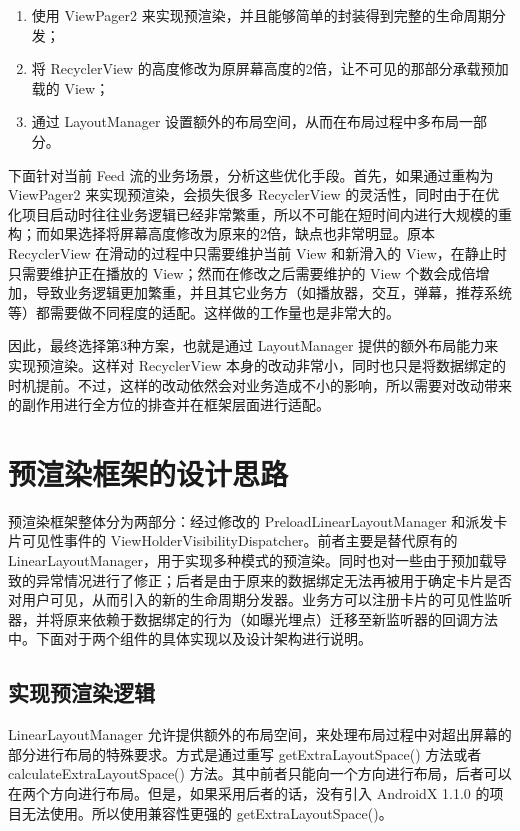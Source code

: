 \begin{enumerate}
    \item 使用 ViewPager2 来实现预渲染，并且能够简单的封装得到完整的生命周期分发；
    \item 将 RecyclerView 的高度修改为原屏幕高度的2倍，让不可见的那部分承载预加载的 View；
    \item 通过 LayoutManager 设置额外的布局空间，从而在布局过程中多布局一部分。
\end{enumerate}

下面针对当前 Feed 流的业务场景，分析这些优化手段。首先，如果通过重构为 ViewPager2 来实现预渲染，会损失很多 RecyclerView 的灵活性，同时由于在优化项目启动时往往业务逻辑已经非常繁重，所以不可能在短时间内进行大规模的重构；而如果选择将屏幕高度修改为原来的2倍，缺点也非常明显。原本 RecyclerView 在滑动的过程中只需要维护当前 View 和新滑入的 View，在静止时只需要维护正在播放的 View；然而在修改之后需要维护的 View 个数会成倍增加，导致业务逻辑更加繁重，并且其它业务方（如播放器，交互，弹幕，推荐系统等）都需要做不同程度的适配。这样做的工作量也是非常大的。

因此，最终选择第3种方案，也就是通过 LayoutManager 提供的额外布局能力来实现预渲染。这样对 RecyclerView 本身的改动非常小，同时也只是将数据绑定的时机提前。不过，这样的改动依然会对业务造成不小的影响，所以需要对改动带来的副作用进行全方位的排查并在框架层面进行适配。

\section{预渲染框架的设计思路}

预渲染框架整体分为两部分：经过修改的 PreloadLinearLayoutManager 和派发卡片可见性事件的 ViewHolderVisibilityDispatcher。前者主要是替代原有的 LinearLayoutManager，用于实现多种模式的预渲染。同时也对一些由于预加载导致的异常情况进行了修正；后者是由于原来的数据绑定无法再被用于确定卡片是否对用户可见，从而引入的新的生命周期分发器。业务方可以注册卡片的可见性监听器，并将原来依赖于数据绑定的行为（如曝光埋点）迁移至新监听器的回调方法中。下面对于两个组件的具体实现以及设计架构进行说明。

\subsection{实现预渲染逻辑}

LinearLayoutManager 允许提供额外的布局空间，来处理布局过程中对超出屏幕的部分进行布局的特殊要求。方式是通过重写 getExtraLayoutSpace() 方法或者 calculateExtraLayoutSpace() 方法。其中前者只能向一个方向进行布局，后者可以在两个方向进行布局。但是，如果采用后者的话，没有引入 AndroidX 1.1.0 的项目无法使用。所以使用兼容性更强的 getExtraLayoutSpace()。

